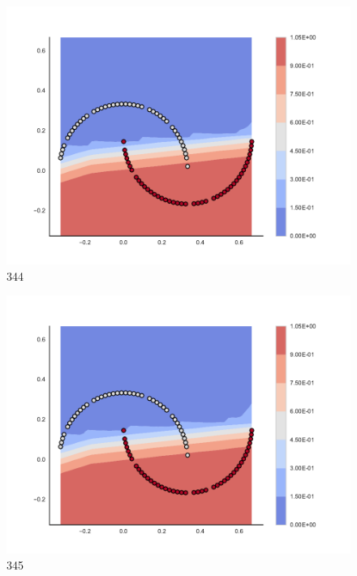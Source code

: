 \begin{subfigure}[b]{0.09\textwidth}
    \includegraphics[clip, trim=2.35cm 1.75cm 4.5cm 0cm,width=\textwidth]{img/convergence/344.pdf}
    \caption{344}
    \label{fig:convergence_344}
\end{subfigure}
%
\begin{subfigure}[b]{0.09\textwidth}
    \includegraphics[clip, trim=2.35cm 1.75cm 4.5cm 0cm,width=\textwidth]{img/convergence/345.pdf}
    \caption{345}
    \label{fig:convergence_345}
\end{subfigure}
%
